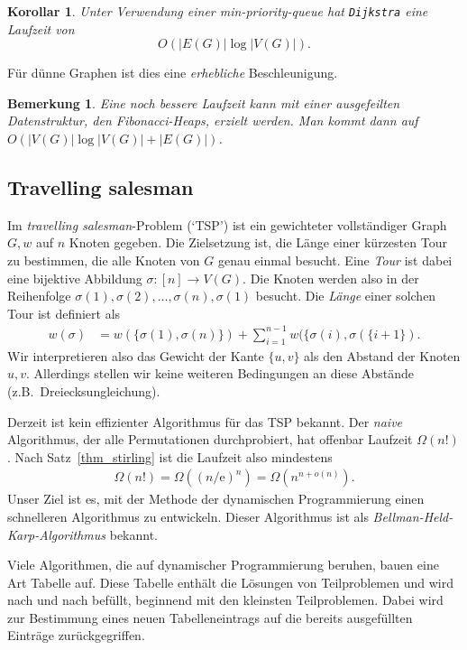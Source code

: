 \documentclass[10pt,reqno]{amsart}
\numberwithin{equation}{section}
\newtheorem{remark}[definition]{Bemerkung}
\newtheorem{corollary}[definition]{Korollar}
\newcommand\eul{\mathrm{e}}
\begin{document}
\begin{corollary}\label{cor_dijkstra}
	Unter Verwendung einer min-priority-queue hat {\tt Dijkstra} eine Laufzeit von $$O(|E(G)|\log|V(G)|).$$
\end{corollary}

\noindent
F\"ur d\"unne Graphen ist dies eine {\em erhebliche} Beschleunigung.

\begin{remark}\label{rem_fibonacci}\upshape
Eine noch bessere Laufzeit kann mit einer ausgefeilten Datenstruktur, den {\em Fibonacci-Heaps}, erzielt werden.
Man kommt dann auf $O(|V(G)|\log|V(G)|+|E(G)|)$.
\end{remark}

\subsection{Travelling salesman}\label{sec_tsp}
Im \emph{travelling salesman}-Problem (`TSP') ist ein gewichteter vollst\"andiger Graph $G,w$ auf $n$ Knoten gegeben.
Die Zielsetzung ist, die L\"ange einer k\"urzesten Tour zu bestimmen, die alle Knoten von $G$ genau einmal besucht.
Eine {\em Tour} ist dabei eine bijektive Abbildung $\sigma:[n]\to V(G)$.
Die Knoten werden also in der Reihenfolge $\sigma(1),\sigma(2),\ldots,\sigma(n),\sigma(1)$ besucht.
Die {\em L\"ange} einer solchen Tour ist definiert als
	\begin{align*}
		w(\sigma)&=w(\{\sigma(1),\sigma(n)\})+\sum_{i=1}^{n-1}w(\{\sigma(i),\sigma(\{i+1\}).
	\end{align*}
Wir interpretieren also das Gewicht der Kante $\{u,v\}$ als den Abstand der Knoten $u,v$.
Allerdings stellen wir keine weiteren Bedingungen an diese Abst\"ande (z.B.\ Dreiecksungleichung).

Derzeit ist kein effizienter Algorithmus f\"ur das TSP bekannt.
Der {\em naive} Algorithmus, der alle Permutationen durchprobiert, hat offenbar Laufzeit $\Omega(n!)$.
Nach Satz~\ref{thm_stirling} ist die Laufzeit also mindestens
\begin{align}\label{eqtsp_naiv}
	\Omega(n!)=\Omega((n/\eul)^n)=\Omega(n^{n+o(n)}).
\end{align}
Unser Ziel ist es, mit der Methode der dynamischen Programmierung einen schnelleren Algorithmus zu entwickeln.
Dieser Algorithmus ist als {\em Bellman-Held-Karp-Algorithmus} bekannt.

Viele Algorithmen, die auf dynamischer Programmierung beruhen, bauen eine Art Tabelle auf.
Diese Tabelle enth\"alt die L\"osungen von Teilproblemen und wird nach und nach bef\"ullt, beginnend mit den kleinsten Teilproblemen.
Dabei wird zur Bestimmung eines neuen Tabelleneintrags auf die bereits ausgef\"ullten Eintr\"age zur\"uckgegriffen.
\end{document}
